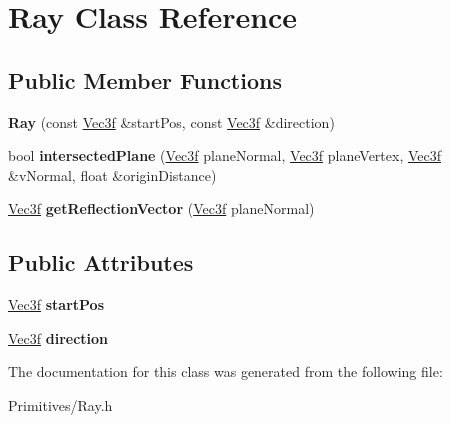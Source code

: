 \hypertarget{class_ray}{}\section{Ray Class Reference}
\label{class_ray}
\subsection*{Public Member Functions}
\begin{DoxyCompactItemize}
\item 
\mbox{\label{class_ray_ac83ad4e3f84ea20a5e198ce490bc3826}} 
{\bfseries Ray} (const \hyperlink{struct_vec3f}{Vec3f} \&start\+Pos, const \hyperlink{struct_vec3f}{Vec3f} \&direction)
\item 
\mbox{\label{class_ray_adba75771d6aea287b72ddde4300d3265}} 
bool {\bfseries intersected\+Plane} (\hyperlink{struct_vec3f}{Vec3f} plane\+Normal, \hyperlink{struct_vec3f}{Vec3f} plane\+Vertex, \hyperlink{struct_vec3f}{Vec3f} \&v\+Normal, float \&origin\+Distance)
\item 
\mbox{\label{class_ray_a74730563d54fd38b2fd1beaad71124dd}} 
\hyperlink{struct_vec3f}{Vec3f} {\bfseries get\+Reflection\+Vector} (\hyperlink{struct_vec3f}{Vec3f} plane\+Normal)
\end{DoxyCompactItemize}
\subsection*{Public Attributes}
\begin{DoxyCompactItemize}
\item 
\mbox{\label{class_ray_a1cd7e5204c62e055877be67ece18df68}} 
\hyperlink{struct_vec3f}{Vec3f} {\bfseries start\+Pos}
\item 
\mbox{\label{class_ray_a884ffd8791df6d6613df52c9feb6ee0a}} 
\hyperlink{struct_vec3f}{Vec3f} {\bfseries direction}
\end{DoxyCompactItemize}


The documentation for this class was generated from the following file\+:\begin{DoxyCompactItemize}
\item 
Primitives/Ray.\+h\end{DoxyCompactItemize}
